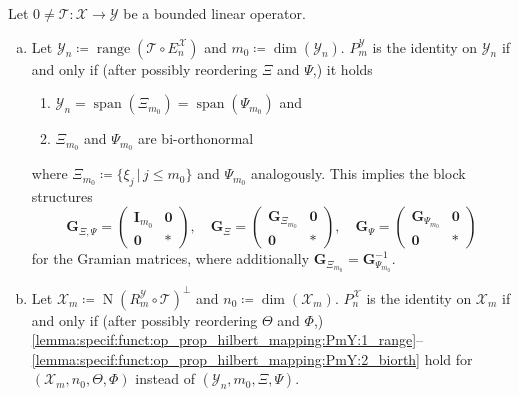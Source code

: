 \documentclass[a4paper]{paper}
\newcommand*{\SPC}[1]{{\ensuremath{\mathscr{#1}}}}
\newcommand*{\SPCX}{\SPC{X}}
\newcommand*{\SPCY}{\SPC{Y}}
\newcommand*{\OP}[1]{{\ensuremath{\mathcal{#1}}}}
\newcommand*{\OPT}{\OP{T}}
\newcommand*{\EXT}[2]{\ensuremath{E_{#1}^{#2}}}
\newcommand*{\REST}[2]{\ensuremath{R_{#1}^{#2}}}
\newcommand*{\PROJ}[2]{\ensuremath{P_{#1}^{#2}}}
\newcommand*{\RmY}{{\ensuremath{\REST{m}{\SPC{Y}}}}}
\newcommand*{\EnX}{{\ensuremath{\EXT{n}{\SPC{X}}}}}
\newcommand*{\PnX}{{\ensuremath{\PROJ{n}{\SPCX}}}}
\newcommand*{\PmY}{{\ensuremath{\PROJ{m}{\SPCY}}}}
\DeclareMathOperator{\RANGE}{range}
\DeclareMathOperator{\NULL}{N}
\DeclareMathOperator{\SPAN}{span}
\DeclareMathOperator{\DIM}{dim}
\DeclareMathOperator{\DEFEQ}{{\coloneqq}}
\newcommand{\vzero}{\boldsymbol{0}}
\newcommand{\vG}{\boldsymbol{G}}
\newcommand{\vI}{\boldsymbol{I}}
\begin{document}
\begin{lemma}
 \label{lemma:specif:funct:op_prop_hilbert_mapping}
 Let $0 \neq \OPT\colon \SPCX \to \SPCY$ be a bounded linear operator. 
 
 \begin{enumerate}[(a)]
  \item \label{lemma:specif:funct:op_prop_hilbert_mapping:PmY}
  Let $\SPCY_n \DEFEQ  \RANGE(\OPT \circ \EnX)$ and $m_0 \DEFEQ  \DIM(\SPCY_n)$. $\PmY$ is the identity on 
  $\SPCY_n$ if and only if (after possibly reordering $\Xi$ and $\Psi$,) it holds
  \begin{enumerate}[({a}1)]
   \item \label{lemma:specif:funct:op_prop_hilbert_mapping:PmY:1_range}
   $\SPCY_n = \SPAN(\Xi_{m_0}) = \SPAN(\Psi_{m_0})$ and
   \item \label{lemma:specif:funct:op_prop_hilbert_mapping:PmY:2_biorth}
   $\Xi_{m_0}$ and $\Psi_{m_0}$ are bi-orthonormal
  \end{enumerate}
  where $\Xi_{m_0} \DEFEQ  \{ \xi_j\, |\, j\leq m_0 \}$ and $\Psi_{m_0}$ analogously. This implies the block 
  structures
  \renewcommand{\arraystretch}{1.1}
  \begin{equation*}
   \vG_{\Xi, \Psi} =
   \left(
   \begin{array}{c|c}
    \vI_{m_0} & \vzero \\[2pt]
    \hline
    \vzero & \boldsymbol{\ast}
   \end{array}
   \right),
   \quad
   \vG_\Xi =
   \left(
   \begin{array}{c|c}
    \vG_{\Xi_{m_0}} & \vzero \\[2pt]
    \hline
    \vzero & \boldsymbol{\ast}
   \end{array}
   \right),
   \quad
   \vG_\Psi =
   \left(
   \begin{array}{c|c}
    \vG_{\Psi_{m_0}} & \vzero \\[2pt]
    \hline
    \vzero & \boldsymbol{\ast}
   \end{array}
   \right)
  \end{equation*}
  \renewcommand{\arraystretch}{1.0}
  for the Gramian matrices, where additionally $\vG_{\Xi_{m_0}} = \vG_{\Psi_{m_0}}^{-1}$. 

  \item \label{lemma:specif:funct:op_prop_hilbert_mapping:PnX}
  Let $\SPCX_m \DEFEQ  \NULL(\RmY \circ \OPT)^\perp$ and $n_0 \DEFEQ  \DIM(\SPCX_m)$. $\PnX$ is the identity on   
  $\SPCX_m$ if and only if (after possibly reordering $\Theta$ and $\Phi$,)
  \eqref{lemma:specif:funct:op_prop_hilbert_mapping:PmY:1_range}--%
  \eqref{lemma:specif:funct:op_prop_hilbert_mapping:PmY:2_biorth}
  hold for $(\SPCX_m, n_0, \Theta, \Phi)$ instead of $(\SPCY_n, m_0, \Xi, \Psi)$.
 \end{enumerate}

\end{lemma}
\vspace{1em}
\end{document}
